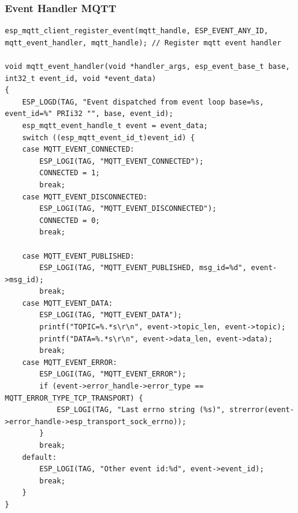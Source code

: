 \documentclass[a4paper,11pt]{article}
\begin{document}
      \subsubsection{Event Handler MQTT}
      \begin{lstlisting}[style=C, caption={Event Handler de la pile IP Netif}]
esp_mqtt_client_register_event(mqtt_handle, ESP_EVENT_ANY_ID, mqtt_event_handler, mqtt_handle); // Register mqtt event handler

void mqtt_event_handler(void *handler_args, esp_event_base_t base, int32_t event_id, void *event_data)
{
    ESP_LOGD(TAG, "Event dispatched from event loop base=%s, event_id=%" PRIi32 "", base, event_id);
    esp_mqtt_event_handle_t event = event_data;
    switch ((esp_mqtt_event_id_t)event_id) {
    case MQTT_EVENT_CONNECTED:
        ESP_LOGI(TAG, "MQTT_EVENT_CONNECTED");
        CONNECTED = 1;
        break;
    case MQTT_EVENT_DISCONNECTED:
        ESP_LOGI(TAG, "MQTT_EVENT_DISCONNECTED");
        CONNECTED = 0;
        break;

    case MQTT_EVENT_PUBLISHED:
        ESP_LOGI(TAG, "MQTT_EVENT_PUBLISHED, msg_id=%d", event->msg_id);
        break;
    case MQTT_EVENT_DATA:
        ESP_LOGI(TAG, "MQTT_EVENT_DATA");
        printf("TOPIC=%.*s\r\n", event->topic_len, event->topic);
        printf("DATA=%.*s\r\n", event->data_len, event->data);
        break;
    case MQTT_EVENT_ERROR:
        ESP_LOGI(TAG, "MQTT_EVENT_ERROR");
        if (event->error_handle->error_type == MQTT_ERROR_TYPE_TCP_TRANSPORT) {
            ESP_LOGI(TAG, "Last errno string (%s)", strerror(event->error_handle->esp_transport_sock_errno));
        }
        break;
    default:
        ESP_LOGI(TAG, "Other event id:%d", event->event_id);
        break;
    }
}
      \end{lstlisting}
\end{document}
